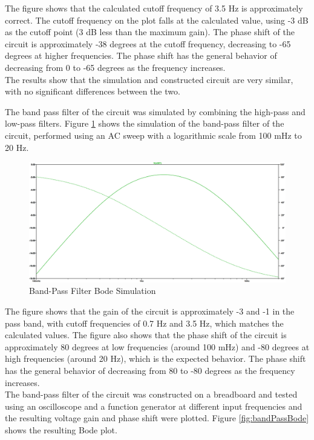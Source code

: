 \documentclass[CMPE]{KGCOEReport}
\begin{document}
The figure shows that the calculated cutoff frequency of 3.5 Hz is approximately correct. The cutoff frequency on the plot falls at the calculated value, using -3 dB as the cutoff point (3 dB less than the maximum gain). The phase shift of the circuit is approximately -38 degrees at the cutoff frequency, decreasing to -65 degrees at higher frequencies. The phase shift has the general behavior of decreasing from 0 to -65 degrees as the frequency increases.\\

The results show that the simulation and constructed circuit are very similar, with no significant differences between the two.

\bigskip

The band pass filter of the circuit was simulated by combining the high-pass and low-pass filters. Figure \ref{fig:bandPassSim} shows the simulation of the band-pass filter of the circuit, performed using an AC sweep with a logarithmic scale from 100 mHz to 20 Hz.

\begin{figure}[H]
    \centering
    \includegraphics[width=1\textwidth]{SimFreqBandPass.png}
    \caption{Band-Pass Filter Bode Simulation}
    \label{fig:bandPassSim}
\end{figure}

The figure shows that the gain of the circuit is approximately -3 and -1 in the pass band, with cutoff frequencies of 0.7 Hz and 3.5 Hz, which matches the calculated values. The figure also shows that the phase shift of the circuit is approximately 80 degrees at low frequencies (around 100 mHz) and -80 degrees at high frequencies (around 20 Hz), which is the expected behavior. The phase shift has the general behavior of decreasing from 80 to -80 degrees as the frequency increases.\\

The band-pass filter of the circuit was constructed on a breadboard and tested using an oscilloscope and a function generator at different input frequencies and the resulting voltage gain and phase shift were plotted. Figure \ref{fig:bandPassBode} shows the resulting Bode plot.
\end{document}
